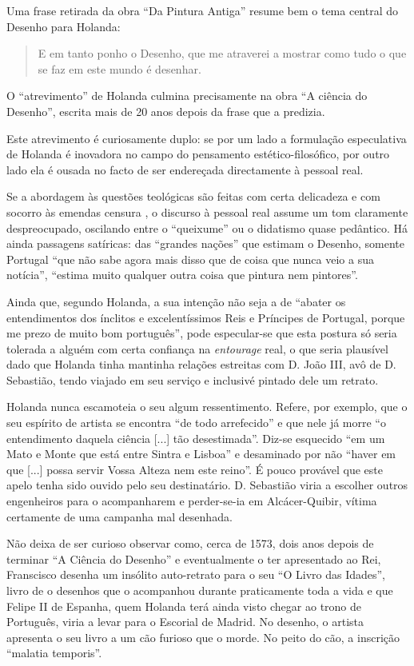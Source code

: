 \documentclass{article}
\begin{document}
Uma frase retirada da obra ``Da Pintura Antiga'' resume bem o tema
central do Desenho para Holanda:

\begin{quote}
  E em tanto ponho o Desenho, que me atraverei a mostrar como tudo o
  que se faz em este mundo é desenhar.
\end{quote}

O ``atrevimento'' de Holanda culmina precisamente na obra ``A ciência
do Desenho'', escrita mais de 20 anos depois da frase que a predizia.

Este atrevimento é curiosamente duplo: se por um lado a formulação
especulativa de Holanda é inovadora no campo do pensamento
estético-filosófico, por outro lado ela é ousada no facto de ser
endereçada directamente à pessoal real.

Se a abordagem às questões teológicas são feitas com certa delicadeza
e com socorro às emendas censura , o discurso à pessoal real assume um
tom claramente despreocupado, oscilando entre o ``queixume'' ou o
didatismo quase pedântico. Há ainda passagens satíricas: das ``grandes
nações'' que estimam o Desenho, somente Portugal ``que não sabe agora
mais disso que de coisa que nunca veio a sua notícia'', ``estima muito
qualquer outra coisa que pintura nem pintores''.

Ainda que, segundo Holanda, a sua intenção não seja a de ``abater os
entendimentos dos ínclitos e excelentíssimos Reis e Príncipes de
Portugal, porque me prezo de muito bom português'', pode especular-se
que esta postura só seria tolerada a alguém com certa confiança na
\emph{entourage} real, o que seria plausível dado que Holanda tinha
mantinha relações estreitas com D. João III, avô de D. Sebastião,
tendo viajado em seu serviço e inclusivé pintado dele um retrato.

Holanda nunca escamoteia o seu algum ressentimento. Refere, por
exemplo, que o seu espírito de artista se encontra ``de todo
arrefecido'' e que nele já morre ``o entendimento daquela ciência
[...] tão desestimada''. Diz-se esquecido ``em um Mato e Monte que
está entre Sintra e Lisboa'' e desaminado por não ``haver em que [...]
possa servir Vossa Alteza nem este reino''. É pouco provável que este
apelo tenha sido ouvido pelo seu destinatário. D. Sebastião viria a
escolher outros engenheiros para o acompanharem \cite[p.54]{holanda} e
perder-se-ia em Alcácer-Quibir, vítima certamente de uma campanha mal
desenhada.

Não deixa de ser curioso observar como, cerca de 1573, dois anos
depois de terminar ``A Ciência do Desenho'' e eventualmente o ter
apresentado ao Rei, Franscisco desenha um insólito auto-retrato para o
seu ``O Livro das Idades'', livro de o desenhos que o acompanhou
durante praticamente toda a vida e que Felipe II de Espanha, quem
Holanda terá ainda visto chegar ao trono de Português, viria a levar
para o Escorial de Madrid. No desenho, o artista apresenta o seu livro
a um cão furioso que o morde. No peito do cão, a inscrição ``malatia
temporis''.

\printbibliography[heading=bibliography,title={Bibliografia}]
\end{document}
